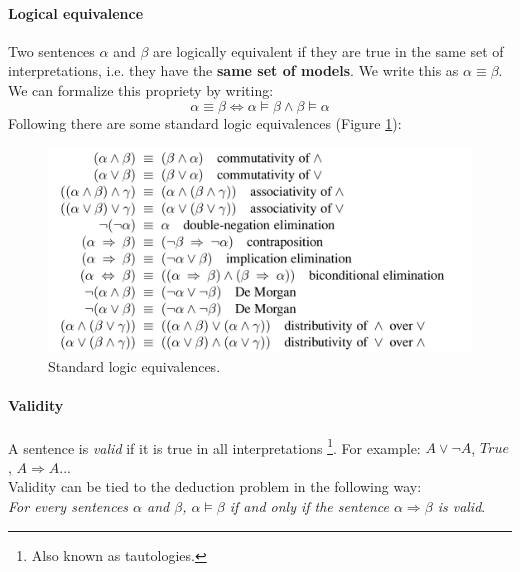 \documentclass[10pt,a4paper]{article}
\begin{document}
\paragraph{Logical equivalence} Two sentences $\alpha$ and $\beta$ are logically equivalent if they are true in the same set of interpretations, i.e. they have the \textbf{same set of models}. We write this as $\alpha \equiv \beta$. We can formalize this propriety by writing:
\[\alpha \equiv \beta \Longleftrightarrow \alpha \models \beta \wedge \beta \models \alpha\]
Following there are some standard logic equivalences (Figure \ref{fig:logic_equivalences}):


\begin{figure}[H]
\includegraphics[scale=0.3]{images/equivalences.png}
\caption{Standard logic equivalences.}
\label{fig:logic_equivalences}
\end{figure}


\paragraph{Validity} A sentence is \textit{valid} if it is true in all interpretations \footnote{Also known as tautologies.}. For example: $A \vee \neg A$, $True$, $A \Rightarrow A$...\\
Validity can be tied to the deduction problem in the following way:\\
\textit{For every sentences $\alpha$ and $\beta$, $\alpha \models \beta$ if and only if the sentence $\alpha \Rightarrow \beta$ is valid}.
\end{document}
